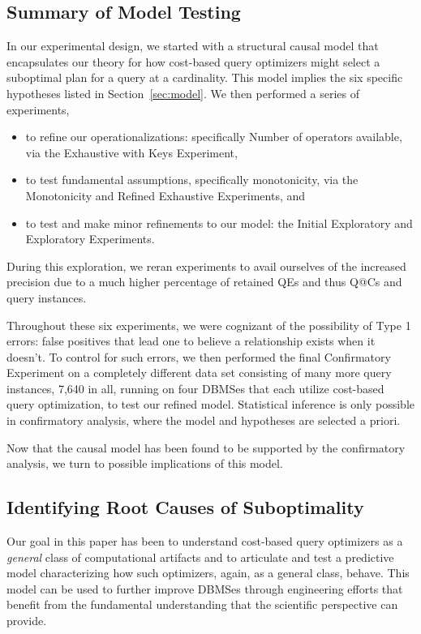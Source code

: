 \documentclass[prodmode,acmtods]{acmsmall}
\begin{document}
\subsection{Summary of Model Testing}
In our experimental design, we started with a structural causal model that
encapsulates our theory for how cost-based query optimizers might select a
suboptimal plan for a query at a cardinality. This model implies the six
specific hypotheses listed in Section~\ref{sec:model}. We then performed
a series of experiments,
\begin{itemize}
\item to refine our operationalizations: specifically  Number of operators available, via the
Exhaustive with Keys \hbox{Experiment},
\item to test fundamental assumptions, specifically
monotonicity, via the Monotonicity and Refined Exhaustive \hbox{Experiments}, and
\item to test and make minor
refinements to our model: the Initial Exploratory and \hbox{Exploratory}
Experiments.
\end{itemize}
During this exploration,  we reran
\hbox{experiments} to avail ourselves of the increased precision due to a much
higher percentage of retained QEs and thus Q@Cs and query instances.

Throughout these six experiments, we were cognizant of the
possibility of Type 1 errors: false positives that lead one to believe a
relationship exists when it doesn't.
To control for such errors, we then performed the final Confirmatory 
Experiment on a completely different data set consisting of many more 
query instances, 7,640 in all, running on four \hbox{DBMSes} that each
utilize cost-based query optimization, to test
our refined model. Statistical inference is only possible in confirmatory
analysis, where the model and hypotheses are selected a priori.

Now that the causal model has been found to be supported by the confirmatory
\hbox{analysis}, we turn to possible implications of this model.

\subsection{Identifying Root Causes of Suboptimality}\label{sec:root}

Our goal in this paper has been to understand cost-based query optimizers
as a \hbox{\em general} class of computational artifacts and to articulate and test
a predictive model \hbox{characterizing} how such optimizers,
again, as a general class, behave.  This model can be used to further
improve \hbox{DBMSes} through engineering \hbox{efforts} that benefit from the fundamental
understanding that the scientific perspective can provide.
\end{document}

